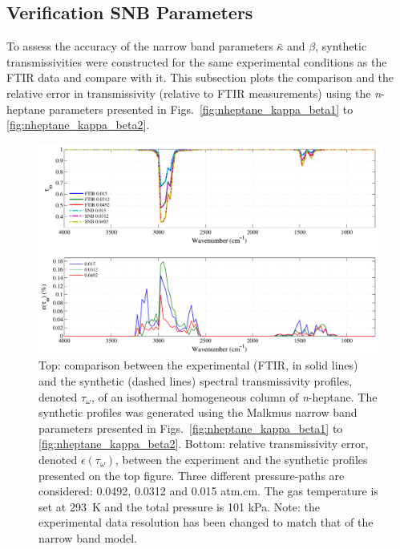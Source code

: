 \subsection{Verification SNB Parameters}

To assess the accuracy of the narrow band parameters $\bar{\kappa}$ and $\beta$, synthetic transmissivities were constructed for the same experimental conditions as the FTIR data and compare with it. This subsection plots the comparison and the relative error in transmissivity (relative to FTIR measurements) using the \textit{n}-heptane parameters presented in Figs.~\ref{fig:nheptane_kappa_beta1} to \ref{fig:nheptane_kappa_beta2}.

\begin{figure}[!h]
\includegraphics[width=\textwidth]{Figures/Comparison_Fit_Heptane_MALKMUS_Temp293K.pdf}
\caption{Top: comparison between the experimental (FTIR, in solid lines) and the synthetic (dashed lines) spectral transmissivity profiles, denoted $\tau_{\omega}$, of an isothermal homogeneous column of \textit{n}-heptane. The synthetic profiles was generated using the Malkmus narrow band parameters presented in Figs.~\ref{fig:nheptane_kappa_beta1} to \ref{fig:nheptane_kappa_beta2}. Bottom: relative transmissivity error, denoted $\epsilon{(\tau_{\omega})}$, between the experiment and the synthetic profiles presented on the top figure. Three different pressure-paths are considered: 0.0492, 0.0312 and 0.015 atm.cm. The gas temperature is set at 293~K and the total pressure is 101 kPa. Note: the experimental data resolution has been changed to match that of the narrow band model. \label{fig:nheptane_SNBVerify_293K}}
\end{figure}

